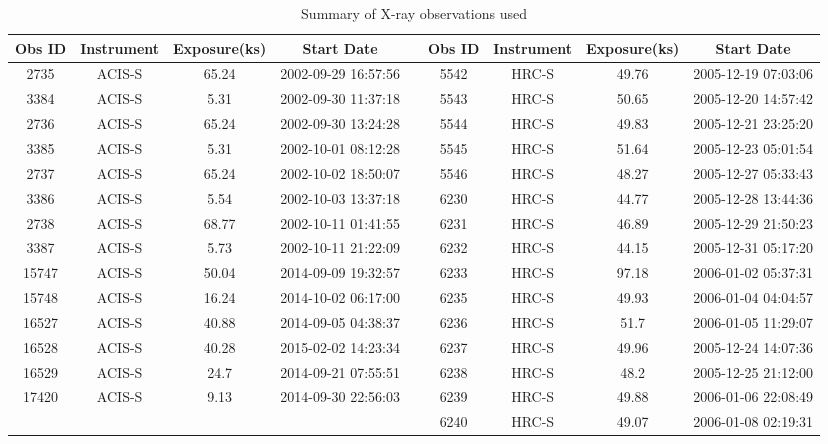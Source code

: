 \documentclass[a4paper,fleqn,usenatbib]{mnras}
\begin{document}
\begin{table}
\centering
\caption{Summary of X-ray observations used}
\label{table:data}
\begin{tabular}{cccc|ccccc}
\hline
Obs ID & Instrument & Exposure(ks) & Start Date          &  & Obs ID & Instrument & Exposure(ks) & Start Date          \\ \hline
2735   & ACIS-S     & 65.24        & 2002-09-29 16:57:56 &  & 5542   & HRC-S      & 49.76        & 2005-12-19 07:03:06 \\
3384   & ACIS-S     & 5.31         & 2002-09-30 11:37:18 &  & 5543   & HRC-S      & 50.65        & 2005-12-20 14:57:42 \\
2736   & ACIS-S     & 65.24        & 2002-09-30 13:24:28 &  & 5544   & HRC-S      & 49.83        & 2005-12-21 23:25:20 \\
3385   & ACIS-S     & 5.31         & 2002-10-01 08:12:28 &  & 5545   & HRC-S      & 51.64        & 2005-12-23 05:01:54 \\
2737   & ACIS-S     & 65.24        & 2002-10-02 18:50:07 &  & 5546   & HRC-S      & 48.27        & 2005-12-27 05:33:43 \\
3386   & ACIS-S     & 5.54         & 2002-10-03 13:37:18 &  & 6230   & HRC-S      & 44.77        & 2005-12-28 13:44:36 \\
2738   & ACIS-S     & 68.77        & 2002-10-11 01:41:55 &  & 6231   & HRC-S      & 46.89        & 2005-12-29 21:50:23 \\
3387   & ACIS-S     & 5.73         & 2002-10-11 21:22:09 &  & 6232   & HRC-S      & 44.15        & 2005-12-31 05:17:20 \\
15747  & ACIS-S     & 50.04        & 2014-09-09 19:32:57 &  & 6233   & HRC-S      & 97.18        & 2006-01-02 05:37:31 \\
15748  & ACIS-S     & 16.24        & 2014-10-02 06:17:00 &  & 6235   & HRC-S      & 49.93        & 2006-01-04 04:04:57 \\
16527  & ACIS-S     & 40.88        & 2014-09-05 04:38:37 &  & 6236   & HRC-S      & 51.7         & 2006-01-05 11:29:07 \\
16528  & ACIS-S     & 40.28        & 2015-02-02 14:23:34 &  & 6237   & HRC-S      & 49.96        & 2005-12-24 14:07:36 \\
16529  & ACIS-S     & 24.7         & 2014-09-21 07:55:51 &  & 6238   & HRC-S      & 48.2         & 2005-12-25 21:12:00 \\
17420  & ACIS-S     & 9.13         & 2014-09-30 22:56:03 &  & 6239   & HRC-S      & 49.88        & 2006-01-06 22:08:49 \\
       &            &              &                     &  & 6240   & HRC-S      & 49.07        & 2006-01-08 02:19:31 \\ \hline
\end{tabular}

\end{table}
\end{document}
